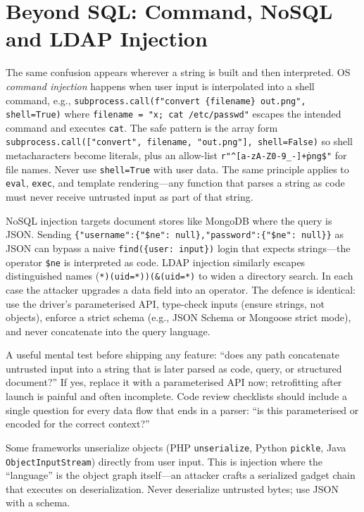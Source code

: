 \section{Beyond SQL: Command, NoSQL and LDAP Injection}\label{sec:other-injection}
The same confusion appears wherever a string is built and then interpreted. OS \emph{command injection} happens when user input is interpolated into a shell command, e.g., \texttt{subprocess.call(f"convert \{filename\} out.png", shell=True)} where \texttt{filename = "x; cat /etc/passwd"} escapes the intended command and executes \texttt{cat}. The safe pattern is the array form \texttt{subprocess.call(["convert", filename, "out.png"], shell=False)} so shell metacharacters become literals, plus an allow-list \texttt{r"\string^[a-zA-Z0-9\_-]+\string\.png\$"} for file names. Never use \texttt{shell=True} with user data. The same principle applies to \texttt{eval}, \texttt{exec}, and template rendering---any function that parses a string as code must never receive untrusted input as part of that string.

NoSQL injection targets document stores like MongoDB where the query is JSON. Sending \texttt{\{"username":\{"\$ne": null\},"password":\{"\$ne": null\}\}} as JSON can bypass a naive \texttt{find(\{user: input\})} login that expects strings---the operator \texttt{\$ne} is interpreted as code. LDAP injection similarly escapes distinguished names (\texttt{*)(uid=*))(\&(uid=*)} to widen a directory search. In each case the attacker upgrades a data field into an operator. The defence is identical: use the driver's parameterised API, type-check inputs (ensure strings, not objects), enforce a strict schema (e.g., JSON Schema or Mongoose strict mode), and never concatenate into the query language.

A useful mental test before shipping any feature: ``does any path concatenate untrusted input into a string that is later parsed as code, query, or structured document?'' If yes, replace it with a parameterised API now; retrofitting after launch is painful and often incomplete. Code review checklists should include a single question for every data flow that ends in a parser: ``is this parameterised or encoded for the correct context?''

\begin{remark}
Some frameworks unserialize objects (PHP \texttt{unserialize}, Python \texttt{pickle}, Java \texttt{ObjectInputStream}) directly from user input. This is injection where the ``language'' is the object graph itself---an attacker crafts a serialized gadget chain that executes on deserialization. Never deserialize untrusted bytes; use JSON with a schema.
\end{remark}

